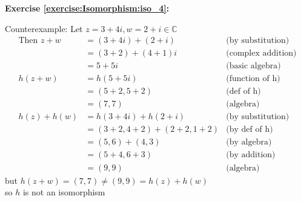 \noindent\textbf{Exercise \ref{exercise:Isomorphism:iso_4}:}
\begin{figure}[H]
\end{figure}
Counterexample: Let $z = 3 + 4i, w = 2 + i \in {\mathbb C}$
\begin{align*}
\text{Then\ } z + w &= (3 + 4i) + (2 + i) &\text{(by substitution)}
\\
&= (3 + 2) + (4 + 1)i &\text{(complex addition)}
\\
&= 5 + 5i &\text{(basic algebra)}
\\
h(z + w) &= h(5 + 5i) &\text{(function of h)}
\\
&= (5 + 2, 5 + 2) &\text{(def of h)}
\\
&= (7, 7) &\text{(algebra)}
\\
h(z) + h(w) &= h(3 + 4i) + h(2 + i) &\text{(by substitution)}
\\
&= (3 + 2, 4 + 2) + (2 + 2, 1 + 2) &\text{(by def of h)}
\\
&= (5, 6) + (4, 3) &\text{(by algebra)}
\\
&= (5 + 4, 6 + 3) &\text{(by addition)}
\\
&= (9, 9) &\text{(algebra)}
\end{align*}
but $h(z + w) = (7, 7) \neq (9, 9) = h(z) + h(w)$
\\
so $h$ is not an isomorphism
\\
\\

